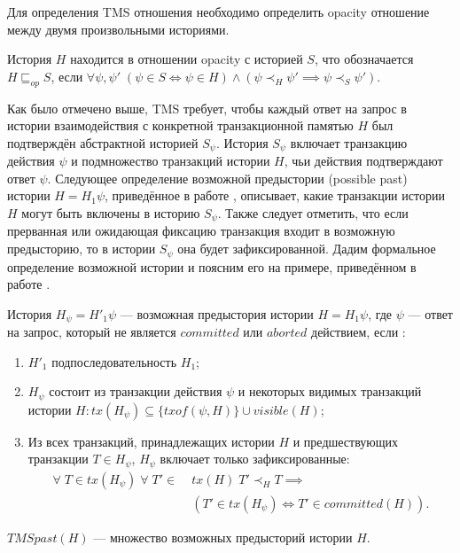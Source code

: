 Для определения TMS отношения необходимо определить opacity отношение между двумя произвольными историями. 

\begin{mydefinition}\label{opacity}
История $H$ находится в отношении opacity с историей $S$, что обозначается $H \sqsubseteq_{op} S$, если $\forall \psi, \psi' \; (\psi \in S \iff \psi \in H ) \land (\psi \prec_H \psi' \implies \psi \prec_S \psi' ).$
\end{mydefinition}

Как было отмечено выше, TMS требует, чтобы каждый ответ на запрос в истории взаимодействия с конкретной транзакционной памятью $H$ был подтверждён абстрактной историей $S_{\psi}$. История $S_{\psi}$ включает транзакцию действия $\psi$ и подмножество транзакций истории $H$, чьи действия подтверждают ответ $\psi$. Следующее определение возможной предыстории (possible past) истории $H = H_1\psi$, приведённое в работе \cite{tms_article}, описывает, какие транзакции истории $H$ могут быть включены в историю $S_{\psi}$. Также следует отметить, что если прерванная или ожидающая фиксацию транзакция входит в возможную предысторию, то в истории $S_{\psi}$ она будет зафиксированной. Дадим формальное определение возможной истории и поясним его на примере, приведённом в работе \cite{tms_article}.

\begin{mydefinition}\label{possible_past}
История $H_{\psi} = H'_1\psi$ --- возможная предыстория истории $H = H_1\psi$, где $\psi$ --- ответ на запрос, который не является $committed$ или $aborted$ действием, если :
\begin{enumerate}[label = (\roman*)]
\item $H'_1$ подпоследовательность $H_1$;
\item $H_{\psi}$ состоит из транзакции действия $\psi$ и некоторых видимых транзакций истории $H: tx(H_{\psi}) \subseteq \{ txof(\psi, H)\} \cup visible(H)$;
\item Из всех транзакций, принадлежащих истории $H$ и предшествующих транзакции $T\in H_{\psi}$, $H_{\psi}$ включает только зафиксированные:
\begin{align*}
\forall \; T \in tx(H_{\psi}) \; \forall \; T' \in \; &tx(H) \; T' \prec_H T \implies \\ &(T' \in tx(H_{\psi}) \iff T' \in committed(H)).
\end{align*}
\end{enumerate}
$TMSpast(H)$ --- множество возможных предысторий истории $H$.
\end{mydefinition}

